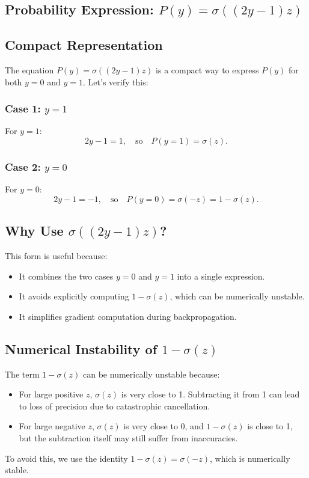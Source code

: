 \begin{notechapter}
\section{Probability Expression: \( P(y) = \sigma((2y - 1)z) \)}

\subsection{Compact Representation}
The equation \( P(y) = \sigma((2y - 1)z) \) is a compact way to express \( P(y) \) for both \( y = 0 \) and \( y = 1 \). Let’s verify this:

\subsubsection{Case 1: \( y = 1 \)}
For \( y = 1 \):
\[
2y - 1 = 1, \quad \text{so} \quad P(y = 1) = \sigma(z).
\]

\subsubsection{Case 2: \( y = 0 \)}
For \( y = 0 \):
\[
2y - 1 = -1, \quad \text{so} \quad P(y = 0) = \sigma(-z) = 1 - \sigma(z).
\]

\subsection{Why Use \( \sigma((2y - 1)z) \)?}
This form is useful because:
\begin{itemize}
    \item It combines the two cases \( y = 0 \) and \( y = 1 \) into a single expression.
    \item It avoids explicitly computing \( 1 - \sigma(z) \), which can be numerically unstable.
    \item It simplifies gradient computation during backpropagation.
\end{itemize}

\subsection{Numerical Instability of \( 1 - \sigma(z) \)}
The term \( 1 - \sigma(z) \) can be numerically unstable because:
\begin{itemize}
    \item For large positive \( z \), \( \sigma(z) \) is very close to 1. Subtracting it from 1 can lead to loss of precision due to catastrophic cancellation.
    \item For large negative \( z \), \( \sigma(z) \) is very close to 0, and \( 1 - \sigma(z) \) is close to 1, but the subtraction itself may still suffer from inaccuracies.
\end{itemize}
To avoid this, we use the identity \( 1 - \sigma(z) = \sigma(-z) \), which is numerically stable.


\end{notechapter}
